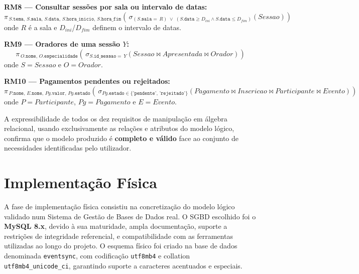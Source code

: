 \documentclass[runningheads]{llncs}
\begin{document}
                \vspace{0.4cm}
                \noindent\textbf{RM8 — Consultar sessões por sala ou intervalo de datas:}
                \[
                \pi_{\,S.\texttt{tema},\,S.\texttt{sala},\,S.\texttt{data},\,S.\texttt{hora\_inicio},\,S.\texttt{hora\_fim}}\!\left(\,\sigma_{(S.\texttt{sala}=\,R)\;\vee\;(S.\texttt{data} \ge D_{ini} \wedge S.\texttt{data} \le D_{fim})}\!\left(\mathit{Sessao}\right)\right)
                \]
                onde $R$ é a sala e $D_{ini}$/$D_{fim}$ definem o intervalo de datas.

                \vspace{0.4cm}
                \noindent\textbf{RM9 — Oradores de uma sessão $Y$:}
                \[
                \pi_{\,O.\texttt{nome},\,O.\texttt{especialidade}}\!\left(\,\sigma_{S.\texttt{id\_sessao}=\,Y}\!\left(\mathit{Sessao} \bowtie \mathit{Apresentada} \bowtie \mathit{Orador}\right)\right)
                \]
                onde $S = \mathit{Sessao}$ e $O = \mathit{Orador}$.

                \vspace{0.4cm}
                \noindent\textbf{RM10 — Pagamentos pendentes ou rejeitados:}
                \[
                \pi_{\,P.\texttt{nome},\,E.\texttt{nome},\,Pg.\texttt{valor},\,Pg.\texttt{estado}}\!\left(\,\sigma_{Pg.\texttt{estado} \in \{\texttt{'pendente'},\,\texttt{'rejeitado'}\}}\!\left(\mathit{Pagamento} \bowtie \mathit{Inscricao} \bowtie \mathit{Participante} \bowtie \mathit{Evento}\right)\right)
                \]
                onde $P = \mathit{Participante}$, $Pg = \mathit{Pagamento}$ e $E = \mathit{Evento}$.

                \vspace{0.3cm}
                A expressibilidade de todos os dez requisitos de manipulação em álgebra
                relacional, usando exclusivamente as relações e atributos do modelo lógico,
                confirma que o modelo produzido é \textbf{completo e válido} face ao conjunto
                de necessidades identificadas pelo utilizador.
        \section{Implementação Física}

        A fase de implementação física consistiu na concretização do modelo lógico validado num Sistema de Gestão de Bases de Dados real. O SGBD escolhido foi o \textbf{MySQL 8.x}, devido à sua maturidade, ampla documentação, suporte a restrições de integridade referencial, e compatibilidade com as ferramentas utilizadas ao longo do projeto. O esquema físico foi criado na base de dados denominada \texttt{eventsync}, com codificação \texttt{utf8mb4} e collation \texttt{utf8mb4\_unicode\_ci}, garantindo suporte a caracteres acentuados e especiais.
\end{document}
